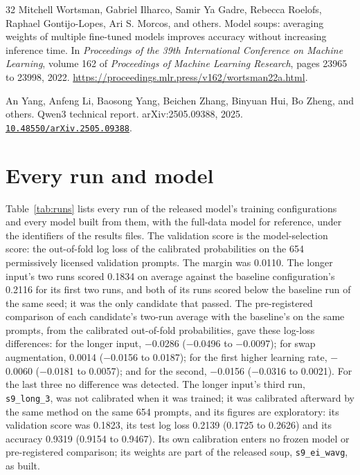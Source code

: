 \documentclass[11pt,letterpaper]{article}
\newcommand{\doi}[1]{\href{https://doi.org/#1}{\nolinkurl{#1}}}
\newcommand{\sysname}[1]{\texttt{#1}}
\begin{document}
\begin{thebibliography}{32}
Mitchell Wortsman, Gabriel Ilharco, Samir Ya Gadre, Rebecca Roelofs, Raphael Gontijo-Lopes, Ari S. Morcos, and others.
\newblock Model soups: averaging weights of multiple fine-tuned models improves accuracy without increasing inference time.
\newblock In \emph{Proceedings of the 39th International Conference on Machine Learning}, volume 162 of \emph{Proceedings of Machine Learning Research}, pages 23965 to 23998, 2022.
\newblock \url{https://proceedings.mlr.press/v162/wortsman22a.html}.

An Yang, Anfeng Li, Baosong Yang, Beichen Zhang, Binyuan Hui, Bo Zheng, and others.
\newblock Qwen3 technical report.
\newblock arXiv:2505.09388, 2025.
\newblock \doi{10.48550/arXiv.2505.09388}.

\end{thebibliography}

\clearpage
\appendix

\section{Every run and model}
\label{app:runs}

Table~\ref{tab:runs} lists every run of the released model's training configurations and every model built from them, with the full-data model for reference, under the identifiers of the results files. The validation score is the model-selection score: the out-of-fold log loss of the calibrated probabilities on the 654 permissively licensed validation prompts. The margin was 0.0110. The longer input's two runs scored 0.1834 on average against the baseline configuration's 0.2116 for its first two runs, and both of its runs scored below the baseline run of the same seed; it was the only candidate that passed. The pre-registered comparison of each candidate's two-run average with the baseline's on the same prompts, from the calibrated out-of-fold probabilities, gave these log-loss differences: for the longer input, $-$0.0286 ($-$0.0496 to $-$0.0097); for swap augmentation, 0.0014 ($-$0.0156 to 0.0187); for the first higher learning rate, $-$0.0060 ($-$0.0181 to 0.0057); and for the second, $-$0.0156 ($-$0.0316 to 0.0021). For the last three no difference was detected. The longer input's third run, \sysname{s9\_long\_3}, was not calibrated when it was trained; it was calibrated afterward by the same method on the same 654 prompts, and its figures are exploratory: its validation score was 0.1823, its test log loss 0.2139 (0.1725 to 0.2626) and its accuracy 0.9319 (0.9154 to 0.9467). Its own calibration enters no frozen model or pre-registered comparison; its weights are part of the released soup, \sysname{s9\_ei\_wavg}, as built.
\end{document}
